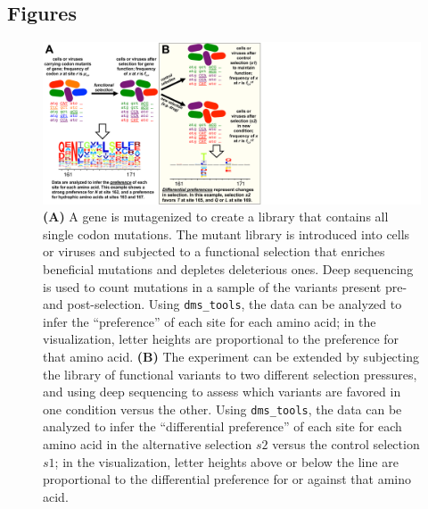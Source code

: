 \documentclass[twocolumn]{bmcart}%
\begin{document}
\begin{backmatter}




\clearpage
\onecolumn

\section*{Figures}

\begin{figure}[h!]
\centerline{\includegraphics[clip, trim=0in 0in 5.92in 0in, width=5.5in]{Fig_DeepMutationalScan/Fig_DeepMutationalScan.pdf}}
\caption{\label{fig:DeepMutationalScan}{ {\bf (A)} A gene is mutagenized to create a library that contains all single codon mutations. The mutant library is introduced into cells or viruses and subjected to a functional selection that enriches beneficial mutations and depletes deleterious ones. Deep sequencing is used to count mutations in a sample of the variants present pre- and post-selection. Using \texttt{dms\_tools}, the data can be analyzed to infer the ``preference'' of each site for each amino acid; in the visualization, letter heights are proportional to the preference for that amino acid. {\bf (B)} The experiment can be extended by subjecting the library of functional variants to two different selection pressures, and using deep sequencing to assess which variants are favored in one condition versus the other. Using \texttt{dms\_tools}, the data can be analyzed to infer the ``differential preference'' of each site for each amino acid in the alternative selection $s2$ versus the control selection $s1$; in the visualization, letter heights above or below the line are proportional to the differential preference for or against that amino acid.}}
\end{figure}


\end{backmatter}
\end{document}
